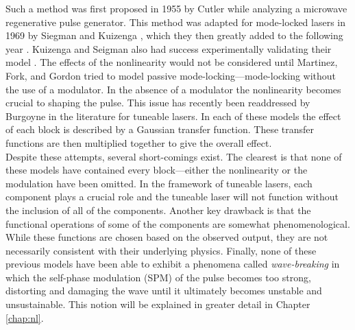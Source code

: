 Such a method was first proposed in 1955 by Cutler \cite{cutler} while analyzing a microwave regenerative pulse generator. This method was adapted for mode-locked lasers in 1969 by Siegman and Kuizenga \cite{seigman}, which they then greatly added to the following year \cite{kuizenga1970a}. Kuizenga and Seigman also had success experimentally validating their model \cite{kuizenga1970b, kuizenga1970}. The effects of the nonlinearity would not be considered until Martinez, Fork, and Gordon \cite{martinez1984, martinez1985} tried to model passive mode-locking---mode-locking without the use of a modulator. In the absence of a modulator the nonlinearity becomes crucial to shaping the pulse. This issue has recently been readdressed by Burgoyne \cite{burgoyne2014} in the literature for tuneable lasers. In each of these models the effect of each block is described by a Gaussian transfer function. These transfer functions are then multiplied together to give the overall effect. \\

Despite these attempts, several short-comings exist. The clearest is that none of these models have contained every block---either the nonlinearity or the modulation have been omitted. In the framework of tuneable lasers, each component plays a crucial role and the tuneable laser will not function without the inclusion of all of the components. Another key drawback is that the functional operations of some of the components are somewhat phenomenological. While these functions are chosen based on the observed output, they are not necessarily consistent with their underlying physics. Finally, none of these previous models have been able to exhibit a phenomena called \emph{wave-breaking} in which the self-phase modulation (SPM) of the pulse becomes too strong, distorting and damaging the wave until it ultimately becomes unstable and unsustainable. This notion will be explained in greater detail in Chapter \ref{chap:nl}. \\
